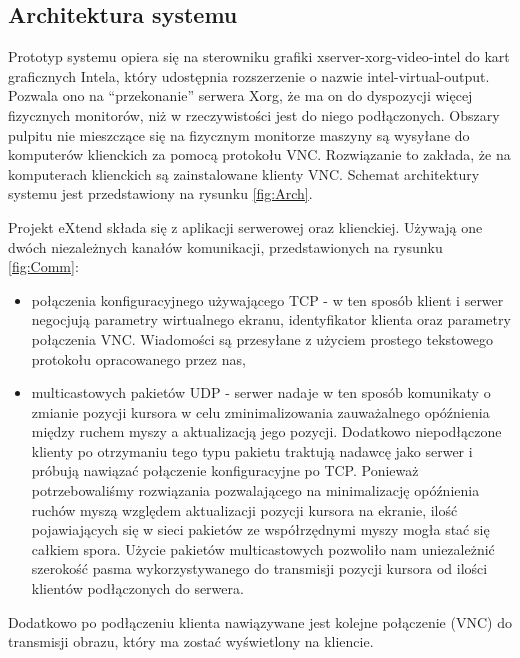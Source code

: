    \vfill

  \subsection{Architektura systemu}

    Prototyp systemu opiera się na sterowniku grafiki xserver-xorg-video-intel do kart graficznych Intela, który udostępnia rozszerzenie o nazwie intel-virtual-output. Pozwala ono na ``przekonanie'' serwera Xorg, że ma on do dyspozycji więcej fizycznych monitorów, niż w rzeczywistości jest do niego podłączonych. Obszary pulpitu nie mieszczące się na fizycznym monitorze maszyny są wysyłane do komputerów klienckich za pomocą protokołu VNC. Rozwiązanie to zakłada, że na komputerach klienckich są zainstalowane klienty VNC. Schemat architektury systemu jest przedstawiony na rysunku \ref{fig:Arch}.


    Projekt eXtend składa się z aplikacji serwerowej oraz klienckiej. Używają one dwóch niezależnych kanałów komunikacji, przedstawionych na rysunku \ref{fig:Comm}:
    \begin{itemize}
      \item połączenia konfiguracyjnego używającego TCP - w ten sposób klient i serwer negocjują parametry wirtualnego ekranu, identyfikator klienta oraz parametry połączenia VNC. Wiadomości są przesyłane z użyciem prostego tekstowego protokołu opracowanego przez nas,

      \item multicastowych pakietów UDP - serwer nadaje w ten sposób komunikaty o zmianie pozycji kursora w celu zminimalizowania zauważalnego opóźnienia między ruchem myszy a aktualizacją jego pozycji. Dodatkowo niepodłączone klienty po otrzymaniu tego typu pakietu traktują nadawcę jako serwer i próbują nawiązać połączenie konfiguracyjne po TCP. Ponieważ potrzebowaliśmy rozwiązania pozwalającego na minimalizację opóźnienia ruchów myszą względem aktualizacji pozycji kursora na ekranie, ilość pojawiających się w sieci pakietów ze współrzędnymi myszy mogła stać się całkiem spora. Użycie pakietów multicastowych pozwoliło nam uniezależnić szerokość pasma wykorzystywanego do transmisji pozycji kursora od ilości klientów podłączonych do serwera.
    \end{itemize}

    Dodatkowo po podłączeniu klienta nawiązywane jest kolejne połączenie (VNC) do transmisji obrazu, który ma zostać wyświetlony na kliencie.

